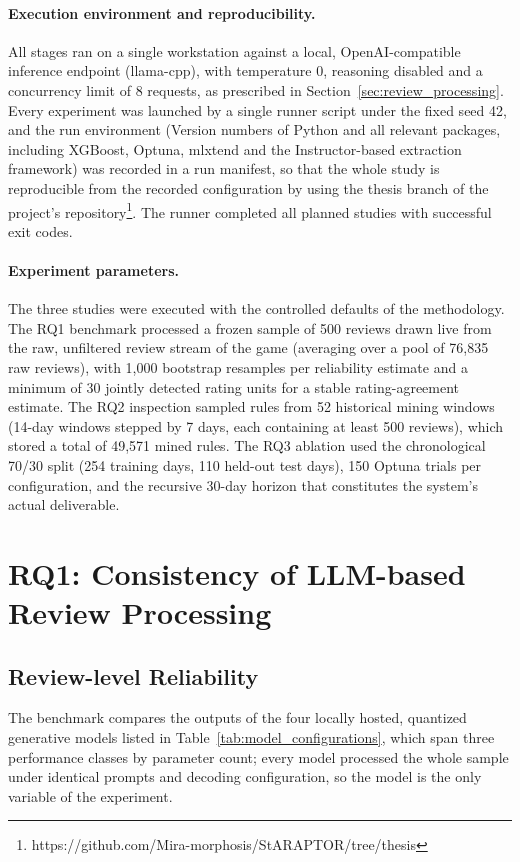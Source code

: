 \paragraph{Execution environment and reproducibility.} All stages ran on a single workstation against a local, OpenAI-compatible inference endpoint (llama-cpp), with temperature 0, reasoning disabled and a concurrency limit of 8 requests, as prescribed in Section~\ref{sec:review_processing}. Every experiment was launched by a single runner script under the fixed seed 42, and the run environment (Version numbers of Python and all relevant packages, including XGBoost, Optuna, mlxtend and the Instructor-based extraction framework) was recorded in a run manifest, so that the whole study is reproducible from the recorded configuration by using the thesis branch of the project's repository\footnote{https://github.com/Mira-morphosis/StARAPTOR/tree/thesis}. The runner completed all planned studies with successful exit codes.

\paragraph{Experiment parameters.} The three studies were executed with the controlled defaults of the methodology. The RQ1 benchmark processed a frozen sample of 500 reviews drawn live from the raw, unfiltered review stream of the game (averaging over a pool of 76{,}835 raw reviews), with 1{,}000 bootstrap resamples per reliability estimate and a minimum of 30 jointly detected rating units for a stable rating-agreement estimate. The RQ2 inspection sampled rules from 52 historical mining windows (14-day windows stepped by 7 days, each containing at least 500 reviews), which stored a total of 49{,}571 mined rules. The RQ3 ablation used the chronological 70/30 split (254 training days, 110 held-out test days), 150 Optuna trials per configuration, and the recursive 30-day horizon that constitutes the system's actual deliverable.

\section{RQ1: Consistency of LLM-based Review Processing}
\label{sec:rq1_results}
\subsection{Review-level Reliability}
\noindent The benchmark compares the outputs of the four locally hosted, quantized generative models listed in Table~\ref{tab:model_configurations}, which span three performance classes by parameter count; every model processed the whole sample under identical prompts and decoding configuration, so the model is the only variable of the experiment.

